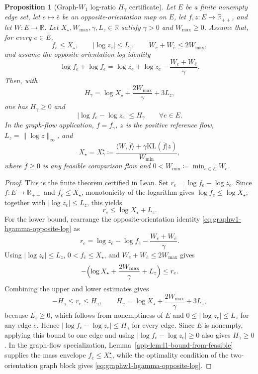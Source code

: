 \documentclass{article}
\theoremstyle{plain}
\newtheorem{proposition}{Proposition}[section]
\newcommand{\length}{W}
\newcommand{\RR}{\mathbb{R}}
\newcommand{\KLdiv}[2]{\mathrm{KL}(#1|#2)}
\begin{document}
\begin{proposition}[Graph-$W_1$ log-ratio $H_\gamma$ certificate]\label{app-prop:hgamma-graphw1}
Let $E$ be a finite nonempty edge set, let $e\mapsto\bar e$ be an
opposite-orientation map on $E$, let $f,z:E\to\RR_{++}$, and let
$\length:E\to\RR$.  Let
$X_\star,\length_{\max},\gamma,L_z\in\RR$ satisfy $\gamma>0$ and
$\length_{\max}\ge0$.  Assume that, for every $e\in E$,
\[
  f_e\le X_\star,\qquad
  |\log z_e|\le L_z,\qquad
  \length_e+\length_{\bar e}\le 2\length_{\max},
\]
and assume the opposite-orientation log identity
\begin{equation}\label{eq:graphw1-hgamma-opposite-log}
  \log f_e+\log f_{\bar e}
  =
  \log z_e+\log z_{\bar e}
  -\frac{\length_e+\length_{\bar e}}{\gamma}.
\end{equation}
Then, with
\[
  H_\gamma=\log X_\star+\frac{2\length_{\max}}{\gamma}+3L_z,
\]
one has $H_\gamma\ge0$ and
\[
  |\log f_e-\log z_e|\le H_\gamma
  \qquad\forall e\in E .
\]
In the graph-flow application, $f=f_\gamma$, $z$ is the positive reference
flow, $L_z=\|\log z\|_\infty$, and
\[
  X_\star=X_\gamma^\star\coloneqq
  \frac{\langle \length,\bar f\rangle+\gamma\KLdiv{\bar f}{z}}{\length_{\min}},
\]
where $\bar f\ge0$ is any feasible comparison flow and
$0<\length_{\min}\coloneqq\min_{e\in E}\length_e$.
\end{proposition}

\begin{proof}
This is the finite theorem certified in Lean.  Set
$r_e=\log f_e-\log z_e$.  Since $f:E\to\RR_{++}$ and $f_e\le X_\star$, monotonicity
of the logarithm gives $\log f_e\le\log X_\star$; together with
$|\log z_e|\le L_z$, this yields
\[
  r_e\le\log X_\star+L_z .
\]
For the lower bound, rearrange the opposite-orientation identity
\eqref{eq:graphw1-hgamma-opposite-log} as
\[
  r_e=\log z_{\bar e}-\log f_{\bar e}
      -\frac{\length_e+\length_{\bar e}}{\gamma}.
\]
Using $|\log z_{\bar e}|\le L_z$, $0<f_{\bar e}\le X_\star$, and
$\length_e+\length_{\bar e}\le2\length_{\max}$ gives
\[
  -\Bigl(\log X_\star+\frac{2\length_{\max}}{\gamma}+L_z\Bigr)
  \le r_e .
\]
Combining the upper and lower estimates gives
\[
  -H_\gamma\le r_e\le H_\gamma,
  \qquad
  H_\gamma=\log X_\star+\frac{2\length_{\max}}{\gamma}+3L_z,
\]
because $L_z\ge0$, which follows from nonemptiness of $E$ and
$0\le|\log z_e|\le L_z$ for any edge $e$.  Hence
$|\log f_e-\log z_e|\le H_\gamma$ for every edge.
Since $E$ is nonempty, applying this bound to one edge and using
$|\log f_e-\log z_e|\ge0$ also gives $H_\gamma\ge0$.  In the graph-flow
specialization, Lemma~\ref{app-lem:l1-bound-from-feasible} supplies the mass
envelope $f_e\le X_\gamma^\star$, while the optimality condition of the
two-orientation graph block gives \eqref{eq:graphw1-hgamma-opposite-log}.
\end{proof}
\end{document}
